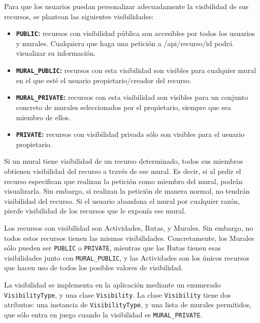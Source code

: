 Para que los usuarios puedan personalizar adecuadamente la visibilidad de sus recursos, se plantean las siguientes visibilidades:
\begin{itemize}
    \item \textbf{\texttt{PUBLIC}:} recursos con visibilidad pública son accesibles por todos los usuarios y murales. Cualquiera que haga una petición a /api/recurso/id podrá visualizar su información.
    \item \textbf{\texttt{MURAL\_PUBLIC}:} recursos con esta visibilidad son visibles para cualquier mural en el que esté el usuario propietario/creador del recurso.
    \item \textbf{\texttt{MURAL\_PRIVATE}:} recursos con esta visibilidad son visibles para un conjunto concreto de murales seleccionados por el propietario, siempre que sea miembro de ellos.
    \item \textbf{\texttt{PRIVATE}:} recursos con visibilidad privada sólo son visibles para el usuario propietario.
\end{itemize}

Si un mural tiene visibilidad de un recurso determinado, todos sus miembros obtienen visibilidad del recurso a través de ese mural. Es decir, si al pedir el recurso especifican que realizan la petición como miembro del mural, podrán visualizarla. Sin embargo, si realizan la petición de manera normal, no tendrán visibilidad del recurso. Si el usuario abandona el mural por cualquier razón, pierde visibilidad de los recursos que le exponía ese mural.

Los recursos con visibilidad son Actividades, Rutas, y Murales. Sin embargo, no todos estos recursos tienen las mismas visibilidades. Concretamente, los Murales sólo pueden ser \texttt{PUBLIC} o \texttt{PRIVATE}, mientras que las Rutas tienen esas visibilidades junto con \texttt{MURAL\_PUBLIC}, y las Actividades son los únicos recursos que hacen uso de todos los posibles valores de visibilidad. 

La visibilidad se implementa en la aplicación mediante un enumerado \texttt{VisibilityType}, y una clase \texttt{Visibility}. La clase \texttt{Visibility} tiene dos atributos: una instancia de \texttt{VisibilityType}, y una lista de murales permitidos, que sólo entra en juego cuando la visibilidad es \texttt{MURAL\_PRIVATE}.

